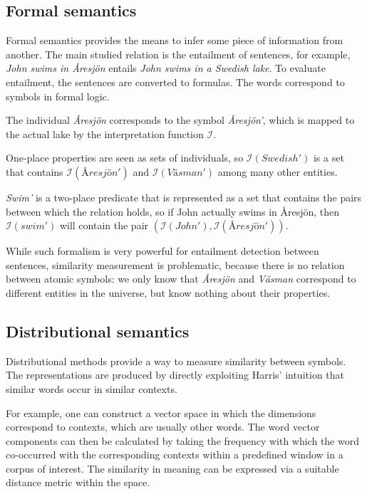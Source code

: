
\subsection{Formal semantics}
\label{sec:classical-approaches}

Formal semantics provides the means to infer some piece of information from another. The main studied relation is the entailment of sentences, for example, \textit{John swims in Åresjön} entails \textit{John swims in a Swedish lake}. To evaluate entailment, the sentences are converted to formulas. The words correspond to symbols in formal logic.

The individual \textit{Åresjön} corresponds to the symbol \textit{Åresjön'}, which is mapped to the actual lake by the interpretation function $\mathcal{I}$.

One-place properties are seen as sets of individuals, so $\mathcal{I}(\mathit{Swedish'})$ is a set that contains $\mathcal{I}(\mathit{Åresjön'})$ and $\mathcal{I}(\mathit{Väsman'})$ among many other entities.

\textit{Swim'} is a two-place predicate that is represented as a set that contains the pairs between which the relation holds, so if John actually swims in Åresjön, then $\mathcal{I}(\mathit{swim'})$ will contain the pair $(\mathcal{I}(\mathit{John'}), \mathcal{I}(\mathit{Åresjön'}))$.

While such formalism is very powerful for entailment detection between sentences, similarity measurement is problematic, because there is no relation between atomic symbols: we only know that \textit{Åresjön} and \textit{Väsman} correspond to different entities in the universe, but know nothing about their properties.

\subsection{Distributional semantics}
\label{sec:distr-repr}

Distributional methods provide a way to measure similarity between symbols. The representations are produced by directly exploiting Harris' \citeyearpar{harris1954distributional} intuition that similar words occur in similar contexts.

For example, one can construct a vector space in which the dimensions correspond to contexts, which are usually other words. The word vector components can then be calculated by taking the frequency with which the word co-occurred with the corresponding contexts within a predefined window in a corpus of interest. The similarity in meaning can be expressed via a suitable distance metric within the space.


